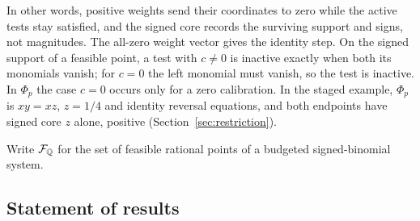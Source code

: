 In other words, positive weights send their coordinates to zero while the
active tests stay satisfied, and the signed core records the surviving
support and signs, not magnitudes. The all-zero weight vector gives the
identity step. On the signed support of a feasible point, a test with
$c\neq0$ is inactive exactly when both its monomials vanish; for $c=0$ the
left monomial must vanish, so the test is inactive. In $\Phi_p$ the case
$c=0$ occurs only for a zero calibration. In the staged example, $\Phi_p$ is
$xy=xz$, $z=1/4$ and identity reversal equations, and both endpoints have
signed core $z$ alone, positive (Section~\ref{sec:restriction}).

Write $\mathcal F_{\mathbb{Q}}$ for the set of feasible rational points of a budgeted
signed-binomial system.

\begin{center}
\end{center}

\subsection{Statement of results}\label{sec:results}

